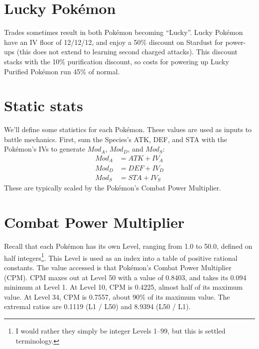 \section{Lucky Pokémon}
\label{sec:lucky}
Trades sometimes result in both Pokémon becoming ``Lucky''.
Lucky Pokémon have an IV floor of 12/12/12, and enjoy a 50\% discount on Stardust for power-ups
  (this does not extend to learning second charged attacks).
This discount stacks with the 10\% purification discount, so costs for
  powering up Lucky Purified Pokémon run 45\% of normal.

\section{Static stats}
\label{sec:staticstats}
We'll define some statistics for each Pokémon.
These values are used as inputs to battle mechanics.
First, sum the Species's ATK, DEF, and STA with the Pokémon's
 IVs to generate $Mod_A$, $Mod_D$, and $Mod_S$:
\begin{align*}
   Mod_A &= ATK + IV_A \\
   Mod_D &= DEF + IV_D \\
   Mod_S &= STA + IV_S
\end{align*}
These are typically scaled by the Pokémon's Combat Power Multiplier.
\section{Combat Power Multiplier}
\label{sec:cpm}
Recall that each Pokémon has its own Level, ranging from 1.0
 to 50.0, defined on half integers\footnote{I would rather they
 simply be integer Levels 1--99, but this is settled terminology.}.
This Level is used as an index into a table of positive rational constants.
The value accessed is that Pokémon's Combat Power Multiplier (CPM).
CPM maxes out at Level 50 with a value of 0.8403, and takes its 
  0.094 minimum at Level 1.
At Level 10, CPM is 0.4225, almost half of its maximum value.
At Level 34, CPM is 0.7557, about 90\% of its maximum value.
The extremal ratios are 0.1119 (L1 / L50) and 8.9394 (L50 / L1).

